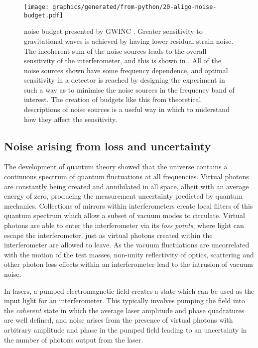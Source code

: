 \begin{figure}
  \centering
  \texttt{[image: graphics/generated/from-python/20-aligo-noise-budget.pdf]}
  \caption[Advanced LIGO noise budget]{\label{fig:aligo-noise-budget}\ALIGO{} noise budget presented by \gls{GWINC} \cite{gwinc}. Greater sensitivity to gravitational waves is achieved by having lower residual strain noise. The incoherent sum of the noise sources leads to the overall sensitivity of the interferometer, and this is shown in . All of the noise sources shown have some frequency dependence, and optimal sensitivity in a detector is reached by designing the experiment in such a way as to minimise the noise sources in the frequency band of interest. The creation of budgets like this from theoretical descriptions of noise sources is a useful way in which to understand how they affect the sensitivity.}
\end{figure}

\subsection{\label{sec:noise-via-loss}Noise arising from loss and uncertainty}
The development of quantum theory showed that the universe contains a continuous spectrum of quantum fluctuations at all frequencies. Virtual photons are constantly being created and annihilated in all space, albeit with an average energy of zero, producing the measurement uncertainty predicted by quantum mechanics. Collections of mirrors within interferometers create local filters of this quantum spectrum which allow a subset of vacuum modes to circulate. Virtual photons are able to enter the interferometer via its \emph{loss points}, where light can escape the interferometer, just as virtual photons created within the interferometer are allowed to leave. As the vacuum fluctuations are uncorrelated with the motion of the test masses, non-unity reflectivity of optics, scattering and other photon loss effects within an interferometer lead to the intrusion of vacuum noise.

In lasers, a pumped electromagnetic field creates a state which can be used as the input light for an interferometer. This typically involves pumping the field into the \emph{coherent} state in which the average laser amplitude and phase quadratures are well defined, and noise arises from the presence of virtual photons with arbitrary amplitude and phase in the pumped field leading to an uncertainty in the number of photons output from the laser.

